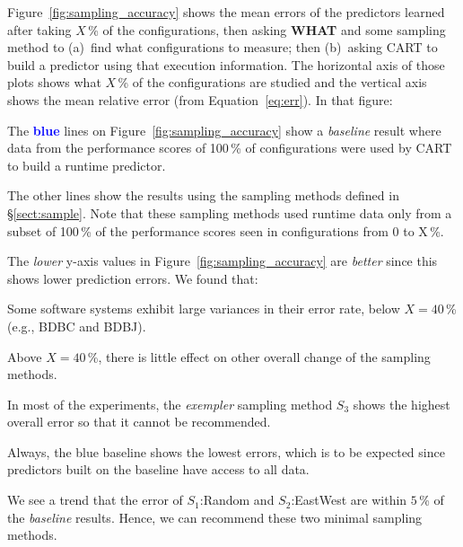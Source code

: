\documentclass{sig-alternative}
\newcommand{\tion}[1]{\S\ref{sect:#1}}
\newcommand{\fig}[1]{Figure~\ref{fig:#1}}
\newcommand{\eq}[1]{Equation~\ref{eq:#1}}
\newcommand{\what}{{\bf WHAT }}
\begin{document}
\fig{sampling_accuracy} shows the mean errors of the predictors learned
after taking $X$\,\% of the configurations, then asking  \what and some sampling method
to (a)~find what configurations to measure; then (b)~asking CART to build a predictor
using that execution information. The horizontal axis of those plots shows what $X$\,\%
of the configurations are studied and the vertical axis shows the mean relative error (from \eq{err}).
In that figure:
\begin{compactitem}
\item
The \textcolor{blue}{{\bf blue}} lines on \fig{sampling_accuracy} show a {\em baseline} result
where data from the performance scores of 100\,\% of  configurations were used by CART
to build a runtime predictor.
\item
The other lines show the results using the sampling methods defined in \tion{sample}.
Note that these sampling methods used  runtime data only from a
subset of 100\,\% of the performance scores seen in configurations
from 0 to X\,\%.
\end{compactitem}


The {\em lower} y-axis values  in  \fig{sampling_accuracy} are {\em better} since this shows lower
prediction errors. We found that:
\begin{compactitem}

\item Some software systems exhibit large variances in their error rate, below $X=40$\,\% (e.g., BDBC and BDBJ).
\item Above $X=40$\,\%, there is little effect on other overall change of the sampling methods.
\item
In most of the experiments, the {\em exempler} sampling method $S_3$ shows the highest overall error 
so that it cannot be recommended.
\item Always, the   blue baseline shows the lowest errors, which is to be
expected since predictors built on the baseline have access to all data.
\item
We see a trend that the error of  $S_1$:Random and $S_2$:EastWest are within $5$\,\% of the {\em baseline} results.
Hence, we can recommend these two minimal sampling methods.
\end{compactitem}
\end{document}
